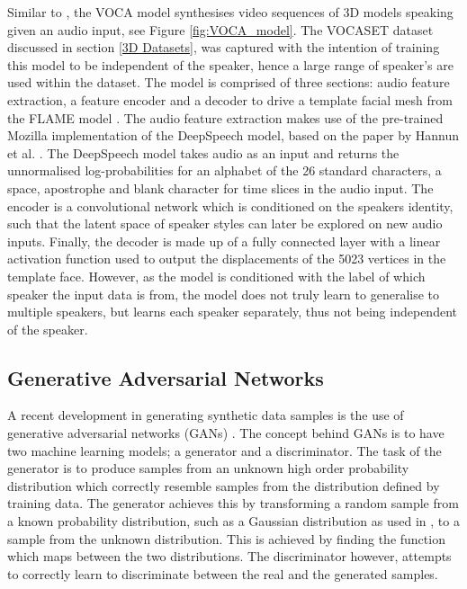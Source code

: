 Similar to \cite{Tzirakis2019}, the VOCA model \cite{Cudeiro2019} synthesises video sequences of 3D models speaking given an audio input, see Figure \ref{fig:VOCA_model}.
The VOCASET dataset discussed in section \ref{3D Datasets}, was captured with the intention of training this model to be independent of the speaker, hence a large range of speaker's are used within the dataset.
The model is comprised of three sections: audio feature extraction, a feature encoder and a decoder to drive a template facial mesh from the FLAME model \cite{Li2017}.
The audio feature extraction makes use of the pre-trained Mozilla implementation of the DeepSpeech model, based on the paper by Hannun et al. \cite{Hannun2014}.
The DeepSpeech model takes audio as an input and returns the unnormalised log-probabilities for an alphabet of the 26 standard characters, a space, apostrophe and blank character for time slices in the audio input.
The encoder is a convolutional network which is conditioned on the speakers identity, such that the latent space of speaker styles can later be explored on new audio inputs.
Finally, the decoder is made up of a fully connected layer with a linear activation function used to output the displacements of the 5023 vertices in the template face.
However, as the model is conditioned with the label of which speaker the input data is from, the model does not truly learn to generalise to multiple speakers, but learns each speaker separately, thus not being independent of the speaker.

\subsection{Generative Adversarial Networks}

A recent development in generating synthetic data samples is the use of generative adversarial networks (GANs) \cite{Goodfellow2014}.
The concept behind GANs is to have two machine learning models; a generator and a discriminator.
The task of the generator is to produce samples from an unknown high order probability distribution which correctly resemble samples from the distribution defined by training data.
The generator achieves this by transforming a random sample from a known probability distribution, such as a Gaussian distribution as used in \cite{Goodfellow2014}, to a sample from the unknown distribution.
This is achieved by finding the function which maps between the two distributions.
The discriminator however, attempts to correctly learn to discriminate between the real and the generated samples.

